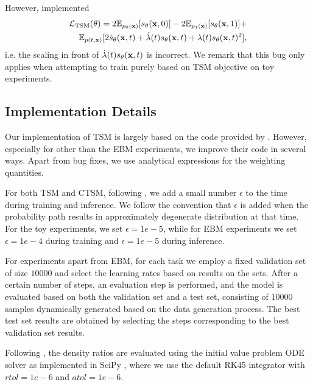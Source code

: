 However, \citet{choi2022densityratio} implemented
\begin{align}
\begin{split}
    \mathcal{L}_{\text{TSM}}(\operatorname{\mathbf{\theta}})
    =
    2 \mathbb{E}_{p_0(\operatorname{\mathbf{x}})}[s_{\operatorname{\mathbf{\theta}}}(\operatorname{\mathbf{x}}, 0)]
    -
    2 \mathbb{E}_{p_1(\operatorname{\mathbf{x}})}[s_{\operatorname{\mathbf{\theta}}}(\operatorname{\mathbf{x}}, 1)]
    + 
    \\
    \mathbb{E}_{p(t, \operatorname{\mathbf{x}})}
    [
    2 \dot{s}_{\operatorname{\mathbf{\theta}}}(\operatorname{\mathbf{x}}, t) 
    +
    \dot{\lambda}(t)
    s_{\operatorname{\mathbf{\theta}}}(\operatorname{\mathbf{x}}, t)
    +
    \lambda(t)
    s_{\operatorname{\mathbf{\theta}}}(\operatorname{\mathbf{x}}, t)^{2}
    ],
\end{split}
\end{align}
i.e. the scaling in front of $\dot{\lambda}(t)s_{\operatorname{\mathbf{\theta}}}(\operatorname{\mathbf{x}}, t)$ is incorrect. We remark that this bug only applies when attempting to train purely based on TSM objective on toy experiments.

\subsection{Implementation Details}
\label{app:sec:impl-details}

Our implementation of TSM is largely based on the code provided by \citet{choi2022densityratio}. However, especially for other than the EBM experiments, we improve their code in several ways. Apart from bug fixes, we use analytical expressions for the weighting quantities.

For both TSM and CTSM, following \citet{choi2022densityratio}, we add a small number $\epsilon$ to the time during training and inference. We follow the convention that $\epsilon$ is added when the probability path results in approximately degenerate distribution at that time. For the toy experiments, we set $\epsilon=1e-5$, while for EBM experiments we set $\epsilon=1e-4$ during training and $\epsilon=1e-5$ during inference.

For experiments apart from EBM, for each task we employ a fixed validation set of size $10000$ and select the learning rates based on results on the sets. After a certain number of steps, an evaluation step is performed, and the model is evaluated based on both the validation set and a test set, consisting of $10000$ samples dynamically generated based on the data generation process. The best test set results are obtained by selecting the steps corresponding to the best validation set results.

Following \citet{choi2022densityratio}, the density ratios are evaluated using the initial value problem ODE solver as implemented in SciPy \citep{virtanen2020scipy}, where we use the default RK45 integrator \citep{dormand1980family} with $rtol=1e-6$ and $atol=1e-6$.

